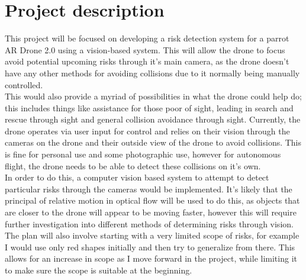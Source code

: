 \documentclass[11pt,fleqn,twoside]{article}
\begin{document}
\wordcount{}

\mmp
 
\setcounter{tocdepth}{3} %



\section{Project description}
This project will be focused on developing a risk detection system for a parrot AR Drone 2.0 using a vision-based system. This will allow the drone to focus avoid potential upcoming risks through it's main camera, as the drone doesn't have any other methods for avoiding collisions due to it normally being manually controlled.\\

This would also provide a myriad of possibilities in what the drone could help do; this includes things like assistance for those poor of sight, leading in search and rescue through sight and general collision avoidance through sight. Currently, the drone operates via user input for control and relies on their vision through the cameras on the drone and their outside view of the drone to avoid collisions. This is fine for personal use and some photographic use, however for autonomous flight, the drone needs to be able to detect these collisions on it's own.\\

In order to do this, a computer vision based system to attempt to detect particular risks through the cameras would be implemented. It's likely that the principal of relative motion in optical flow will be used to do this, as objects that are closer to the drone will appear to be moving faster, however this will require further investigation into different methods of determining risks through vision. The plan will also involve starting with a very limited scope of risks, for example I would use only red shapes initially and then try to generalize from there. This allows for an increase in scope as I move forward in the project, while limiting it to make sure the scope is suitable at the beginning. \\
\end{document}
